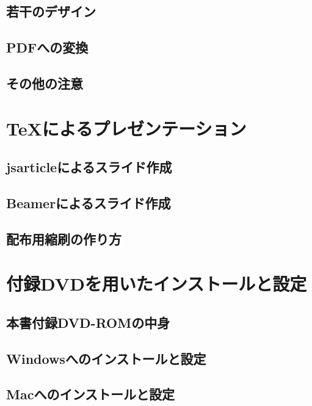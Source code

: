 \documentclass{jsbook}
\begin{document}
\section{若干のデザイン}

\section{PDFへの変換}

\section{その他の注意}

\chapter{\TeX によるプレゼンテーション}

\section{jsarticleによるスライド作成}

\section{Beamerによるスライド作成}

\section{配布用縮刷の作り方}

\appendix

\chapter{付録DVDを用いたインストールと設定}

\section{本書付録DVD-ROMの中身}

\section{Windowsへのインストールと設定}

\section{Macへのインストールと設定}
\end{document}
